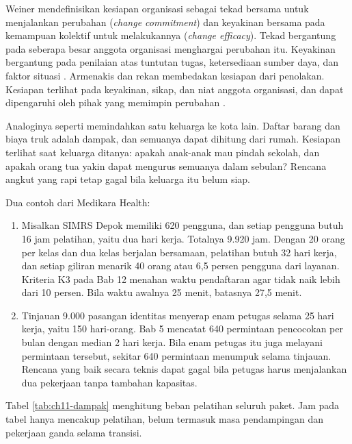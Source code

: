 Weiner mendefinisikan kesiapan organisasi sebagai tekad bersama untuk menjalankan perubahan (\textit{change commitment}) dan
keyakinan bersama pada kemampuan kolektif untuk melakukannya (\textit{change efficacy}). Tekad bergantung pada seberapa besar anggota
organisasi menghargai perubahan itu. Keyakinan bergantung pada penilaian atas tuntutan tugas, ketersediaan sumber daya, dan faktor
situasi \cite{c11-weiner2009}. Armenakis dan rekan membedakan kesiapan dari penolakan. Kesiapan terlihat pada keyakinan, sikap, dan
niat anggota organisasi, dan dapat dipengaruhi oleh pihak yang memimpin perubahan \cite{c11-armenakis1993}.

Analoginya seperti memindahkan satu keluarga ke kota lain. Daftar barang dan biaya truk adalah dampak, dan semuanya dapat dihitung
dari rumah. Kesiapan terlihat saat keluarga ditanya: apakah anak-anak mau pindah sekolah, dan apakah orang tua yakin dapat mengurus
semuanya dalam sebulan? Rencana angkut yang rapi tetap gagal bila keluarga itu belum siap.

Dua contoh dari Medikara Health:
\begin{enumerate}
  \item Misalkan SIMRS Depok memiliki 620 pengguna, dan setiap pengguna butuh 16 jam pelatihan, yaitu dua hari kerja. Totalnya
        9.920 jam. Dengan 20 orang per kelas dan dua kelas berjalan bersamaan, pelatihan butuh 32 hari kerja, dan setiap giliran
        menarik 40 orang atau 6,5 persen pengguna dari layanan. Kriteria K3 pada Bab 12 menahan waktu pendaftaran agar tidak naik
        lebih dari 10 persen. Bila waktu awalnya 25 menit, batasnya 27,5 menit.
  \item Tinjauan 9.000 pasangan identitas menyerap enam petugas selama 25 hari kerja, yaitu 150 hari-orang. Bab 5 mencatat 640
        permintaan pencocokan per bulan dengan median 2 hari kerja. Bila enam petugas itu juga melayani permintaan tersebut, sekitar
        640 permintaan menumpuk selama tinjauan. Rencana yang baik secara teknis dapat gagal bila petugas harus menjalankan dua
        pekerjaan tanpa tambahan kapasitas.
\end{enumerate}

Tabel \ref{tab:ch11-dampak} menghitung beban pelatihan seluruh paket. Jam pada tabel hanya mencakup pelatihan, belum termasuk masa
pendampingan dan pekerjaan ganda selama transisi.

